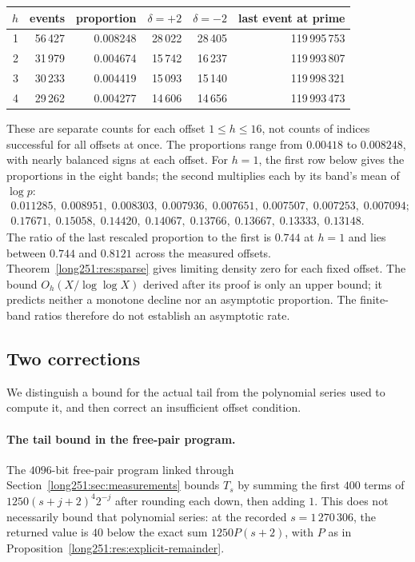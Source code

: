 \begin{center}
\small
\begin{tabular}{@{}rrrrrr@{}}
\toprule
$h$ & events & proportion & $\delta=+2$ & $\delta=-2$ & last event at prime\\
\midrule
1 & 56\,427 & 0.008248 & 28\,022 & 28\,405 & 119\,995\,753\\
2 & 31\,979 & 0.004674 & 15\,742 & 16\,237 & 119\,993\,807\\
3 & 30\,233 & 0.004419 & 15\,093 & 15\,140 & 119\,998\,321\\
4 & 29\,262 & 0.004277 & 14\,606 & 14\,656 & 119\,993\,473\\
\bottomrule
\end{tabular}
\end{center}

These are separate counts for each offset $1\le h\le16$, not counts
of indices successful for all offsets at once.  The proportions range
from $0.00418$ to $0.008248$, with nearly balanced signs at each offset.
For $h=1$, the first row below gives the proportions in the eight bands;
the second multiplies each by its band's mean of $\log p$:
\[
\begin{array}{l}
 0.011285,\;0.008951,\;0.008303,\;0.007936,\;0.007651,\;0.007507,\;0.007253,\;0.007094;\\[2pt]
 0.17671,\;0.15058,\;0.14420,\;0.14067,\;0.13766,\;0.13667,\;0.13333,\;0.13148 .
\end{array}
\]
The ratio of the last rescaled proportion to the first is $0.744$ at
$h=1$ and lies between $0.744$ and $0.8121$ across the measured offsets.
Theorem~\ref{long251:res:sparse} gives limiting density zero for each
fixed offset.  The bound $O_h(X/\log\log X)$ derived after its proof is
only an upper bound; it predicts neither a monotone decline nor an
asymptotic proportion.  The finite-band ratios therefore do not
establish an asymptotic rate.

\subsection{Two corrections}\label{long251:sec:xr-corrections}

We distinguish a bound for the actual tail from the polynomial series
used to compute it, and then correct an insufficient offset condition.

\paragraph{The tail bound in the free-pair program.}
The $4096$-bit free-pair program linked through
Section~\ref{long251:sec:measurements} bounds $T_s$ by summing the first
$400$ terms of $1250(s+j+2)^4 2^{-j}$ after rounding each down, then
adding $1$.  This does not necessarily bound that polynomial series:
at the recorded $s=1\,270\,306$, the returned value is $40$ below the
exact sum $1250P(s+2)$, with $P$ as in
Proposition~\ref{long251:res:explicit-remainder}.

